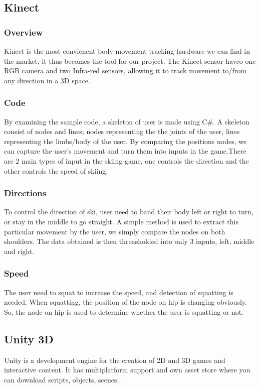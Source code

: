 \documentclass[fonts]{icst}
\begin{document}
\subsection{Kinect}
\subsubsection{Overview}
Kinect is the most convienent body movement tracking hardware we can find in the market, it thus becomes the tool for our project. The Kinect sensor haveo one RGB camera and two Infra-red sensors, allowing it to track movement to/from any direction in a 3D space. 

\subsubsection{Code}
By examining the sample code, a skeleton of user is made using C\#. A skeleton consist of nodes and lines, nodes representing the the joints of the user, lines representing the limbs/body of the user. By comparing the positions nodes, we can capture the user's movement and turn them into inputs in the game.There are 2 main types of input in the skiing game, one controls the direction and the other controls the speed of skiing.

\subsubsection{Directions}
To control the direction of ski, user need to band their body left or right to turn, or stay in the middle to go straight. A simple method is used to extract this particular movement by the user, we simply compare the nodes on both shoulders. The data obtained is then threasholded into only 3 inputs, left, middle and right. 

\subsubsection{Speed}
The user need to squat to increase the speed, and detection of squatting is needed. When squatting, the position of the node on hip is changing obviously. So, the node on hip is used to determine whether the user is squatting or not.

\subsection{Unity 3D}
Unity is a development engine for the creation of 2D and 3D games and interactive content. It has multiplatform support and own asset store where you can download scripts, objects, scenes.. \cite{UNITY}
\end{document}
